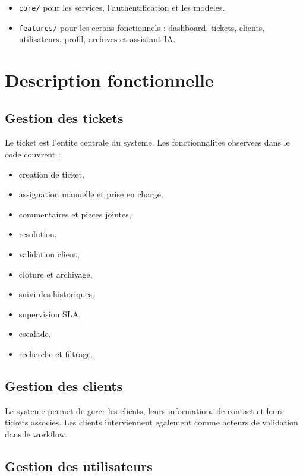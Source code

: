 \documentclass[12pt,a4paper]{article}
\begin{document}
\begin{itemize}[leftmargin=1.2cm]
  \item \texttt{core/} pour les services, l'authentification et les modeles.
  \item \texttt{features/} pour les ecrans fonctionnels : dashboard, tickets, clients, utilisateurs, profil, archives et assistant IA.
\end{itemize}

\section{Description fonctionnelle}

\subsection{Gestion des tickets}

Le ticket est l'entite centrale du systeme. Les fonctionnalites observees dans le code couvrent :

\begin{itemize}[leftmargin=1.2cm]
  \item creation de ticket,
  \item assignation manuelle et prise en charge,
  \item commentaires et pieces jointes,
  \item resolution,
  \item validation client,
  \item cloture et archivage,
  \item suivi des historiques,
  \item supervision SLA,
  \item escalade,
  \item recherche et filtrage.
\end{itemize}

\subsection{Gestion des clients}

Le systeme permet de gerer les clients, leurs informations de contact et leurs tickets associes. Les clients interviennent egalement comme acteurs de validation dans le workflow.

\subsection{Gestion des utilisateurs}
\end{document}
